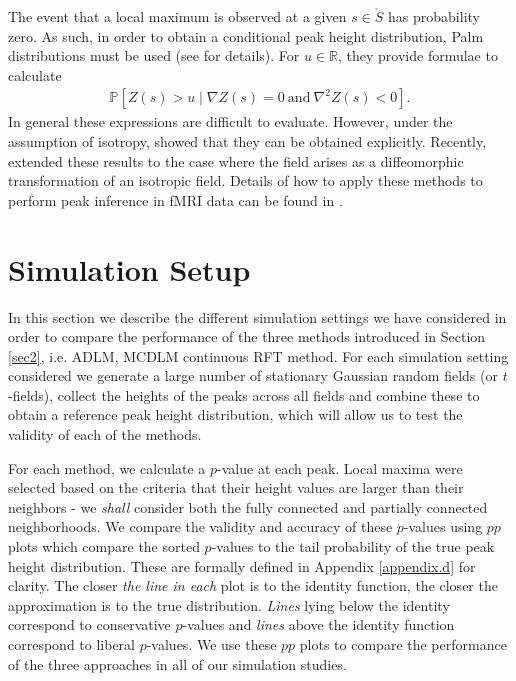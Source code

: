 \documentclass{article}
\newcommand{\nt}[1]{\textit{\color{red} #1}}
\begin{document}
The event that a local maximum is observed at a given $s \in \mathring{S}$ has probability zero. As such, in order to obtain a conditional peak height distribution, Palm distributions must be used (see \cite{cheng2015distribution} for details). For $ u \in \mathbb{R}$, they provide formulae to calculate
\begin{align}
	\mathbb{P}[Z(s)>u\mid \nabla{Z}(s) = 0\ \text{and}\ \nabla^2{Z}(s)<0]. \label{eqn2.1}
\end{align}
In general these expressions are difficult to evaluate. However, under the assumption of isotropy, \cite{cheng2015explicit} showed that they can be obtained explicitly. Recently, \cite{cheng2020critical} extended these results to the case where the field arises as a diffeomorphic transformation of an isotropic field. Details of how to apply these methods to perform peak inference in fMRI data can be found in \cite{schwartzman2019peak}.

\section{Simulation Setup}
\label{sec3}
In this section we describe the different simulation settings we have considered in order to compare the performance of the three methods introduced in Section \ref{sec2}, i.e. ADLM, MCDLM continuous RFT method. For each simulation setting considered we generate a large number of stationary Gaussian random fields (or $t$-fields), collect the heights of the peaks across all fields and combine these to obtain a reference peak height distribution, which will allow us to test the validity of each of the methods.

For each method, we calculate a $p$-value at each peak. Local maxima were selected based on the criteria that their height values are
larger than their neighbors - we \nt{shall} consider both the fully connected and partially
connected neighborhoods. We compare the validity and accuracy of these $p$-values using $pp$ plots which compare the sorted $p$-values to the tail probability of the true peak height distribution. These are formally defined in Appendix \ref{appendix.d} for clarity. The closer \nt{the line in each} plot is to the identity function, the closer the approximation is to the true distribution. \nt{Lines} lying below the identity correspond to conservative $p$-values and \nt{lines} above the identity function correspond to liberal $p$-values. We use
these $pp$ plots to compare the performance of the three approaches in all of our simulation studies.
\end{document}
